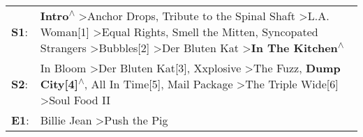 \begin{supertabular}{p{0.03\textwidth}p{0.92\textwidth}}
 \textbf{S1}:  &  \textbf{Intro\textsuperscript{$\wedge$}} \textgreater \enspace Anchor Drops\textsuperscript{}, \enspace Tribute to the Spinal Shaft\textsuperscript{} \textgreater \enspace L.A. Woman[1]\textsuperscript{} \textgreater \enspace Equal Rights\textsuperscript{}, \enspace Smell the Mitten\textsuperscript{}, \enspace Syncopated Strangers\textsuperscript{} \textgreater \enspace Bubbles[2]\textsuperscript{} \textgreater \enspace Der Bluten Kat\textsuperscript{} \textgreater \enspace \textbf{In The Kitchen\textsuperscript{$\wedge$}}  \enspace  \\
 \textbf{S2}:  &                                                                                                         In Bloom\textsuperscript{} \textgreater \enspace Der Bluten Kat[3]\textsuperscript{}, \enspace Xxplosive\textsuperscript{} \textgreater \enspace The Fuzz\textsuperscript{}, \enspace \textbf{Dump City[4]\textsuperscript{$\wedge$}}, \enspace All In Time[5]\textsuperscript{}, \enspace Mail Package\textsuperscript{} \textgreater \enspace The Triple Wide[6]\textsuperscript{} \textgreater \enspace Soul Food II\textsuperscript{}  \enspace  \\
 \textbf{E1}:  &                                                                                                                                                                                                                                                                                                                                                                                                                                                                Billie Jean\textsuperscript{} \textgreater \enspace Push the Pig\textsuperscript{}  \enspace  \\
\end{supertabular}

